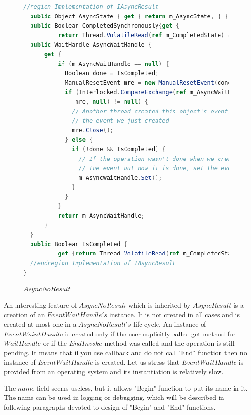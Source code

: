 \begin{figure}[!hbp]
\begin{lstlisting}[language=cs]
  //region Implementation of IAsyncResult
  public Object AsyncState { get { return m_AsyncState; } }
  public Boolean CompletedSynchronously{get { 
          return Thread.VolatileRead(ref m_CompletedState) ==  ic_scs; }}
  public WaitHandle AsyncWaitHandle {
      get {
          if (m_AsyncWaitHandle == null) {
            Boolean done = IsCompleted;
            ManualResetEvent mre = new ManualResetEvent(done);
            if (Interlocked.CompareExchange(ref m_AsyncWaitHandle,
               mre, null) != null) {
              // Another thread created this object's event; dispose 
              // the event we just created
              mre.Close();
            } else {
              if (!done && IsCompleted) {
                // If the operation wasn't done when we created 
                // the event but now it is done, set the event
                m_AsyncWaitHandle.Set();
              }
            }
          }
          return m_AsyncWaitHandle;
      }
  }
  public Boolean IsCompleted {
          get {return Thread.VolatileRead(ref m_CompletedState) != c_sp; }}
  //endregion Implementation of IAsyncResult
}
\end{lstlisting}
\caption{$AsyncNoResult$} 
\label{noresult}
\end{figure}


  An interesting feature of $AsyncNoResult$ which is inherited by $AsyncResult$ is a creation of an $EventWaitHandle's$ instance.
  It is not created in all cases and is created at most one in a $AsyncNoResult's$ life cycle.
  An instance of $EventWaintHandle$ is created only if the user explicitly called get method for $WaitHandle$ or
  if the $EndInvoke$ method was called and the operation is still pending.
  It means that if you use callback and do not call "End" function then no instance of $EventWaitHandle$ is created.
  Let us stress that $EventWaitHandle$ is provided from an operating system and its instantiation is relatively slow.

  The $name$ field seems useless, but it allows "Begin" function to put its name in it. 
  The name can be used in logging or debugging, which will be described in following paragraphs devoted 
  to design of "Begin" and "End" functions.

